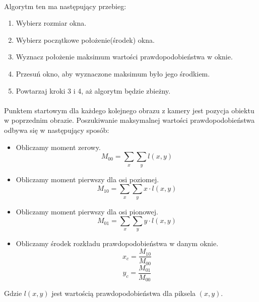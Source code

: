 \paragraph*{}
Algorytm ten ma następujący przebieg:
\begin{enumerate}
\item Wybierz rozmiar okna.
\item Wybierz początkowe położenie(środek) okna.
\item Wyznacz położenie maksimum wartości prawdopodobieństwa w oknie.
\item Przesuń okno, aby wyznaczone maksimum było jego środkiem.
\item Powtarzaj kroki 3 i 4, aż algorytm będzie zbieżny.
\end{enumerate}
\paragraph*{}
Punktem startowym dla każdego kolejnego obrazu z kamery jest pozycja obiektu w poprzednim obrazie. Poszukiwanie maksymalnej wartości prawdopodobieństwa odbywa się w następujący sposób:
\begin{itemize}
\item Obliczamy moment zerowy.
\begin{equation}
M_{00}=\sum\limits_{x}\sum\limits_{y}l(x,y)
\end{equation}
\item Obliczamy moment pierwszy dla osi poziomej.
\begin{equation}
M_{10}=\sum\limits_{x}\sum\limits_{y}x \cdot l(x,y)
\end{equation}
\item Obliczamy moment pierwszy dla osi pionowej.
\begin{equation}
M_{01}=\sum\limits_{x}\sum\limits_{y}y \cdot l(x,y)
\end{equation}
\item Obliczamy środek rozkładu prawdopodobieństwa w danym oknie.
\begin{equation}
x_c=\frac{M_{10}}{M_{00}}
\end{equation}
\begin{equation}
y_c=\frac{M_{01}}{M_{00}}
\end{equation}
\end{itemize}
Gdzie \(l(x,y)\) jest wartością prawdopodobieństwa dla piksela \((x,y)\)\cite{BCV}.

